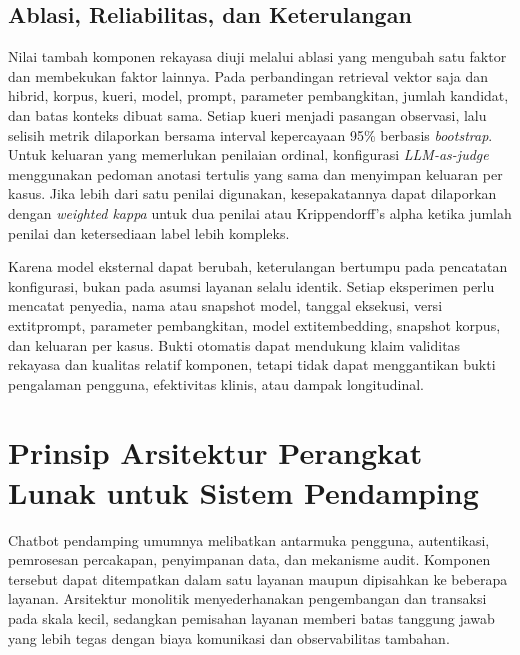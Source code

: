 \subsection{Ablasi, Reliabilitas, dan Keterulangan}

Nilai tambah komponen rekayasa diuji melalui ablasi yang mengubah satu faktor dan membekukan faktor lainnya. Pada perbandingan retrieval vektor saja dan hibrid, korpus, kueri, model, prompt, parameter pembangkitan, jumlah kandidat, dan batas konteks dibuat sama. Setiap kueri menjadi pasangan observasi, lalu selisih metrik dilaporkan bersama interval kepercayaan 95\% berbasis \textit{bootstrap}. Untuk keluaran yang memerlukan penilaian ordinal, konfigurasi \textit{LLM-as-judge} menggunakan pedoman anotasi tertulis yang sama dan menyimpan keluaran per kasus. Jika lebih dari satu penilai digunakan, kesepakatannya dapat dilaporkan dengan \textit{weighted kappa} untuk dua penilai atau Krippendorff's alpha ketika jumlah penilai dan ketersediaan label lebih kompleks.

Karena model eksternal dapat berubah, keterulangan bertumpu pada pencatatan konfigurasi, bukan pada asumsi layanan selalu identik. Setiap eksperimen perlu mencatat penyedia, nama atau snapshot model, tanggal eksekusi, versi 	extit{prompt}, parameter pembangkitan, model 	extit{embedding}, snapshot korpus, dan keluaran per kasus. Bukti otomatis dapat mendukung klaim validitas rekayasa dan kualitas relatif komponen, tetapi tidak dapat menggantikan bukti pengalaman pengguna, efektivitas klinis, atau dampak longitudinal.


\section{Prinsip Arsitektur Perangkat Lunak untuk Sistem Pendamping}
\label{sec:arsitektur}

Chatbot pendamping umumnya melibatkan antarmuka pengguna, autentikasi, pemrosesan percakapan, penyimpanan data, dan mekanisme audit. Komponen tersebut dapat ditempatkan dalam satu layanan maupun dipisahkan ke beberapa layanan. Arsitektur monolitik menyederhanakan pengembangan dan transaksi pada skala kecil, sedangkan pemisahan layanan memberi batas tanggung jawab yang lebih tegas dengan biaya komunikasi dan observabilitas tambahan.

